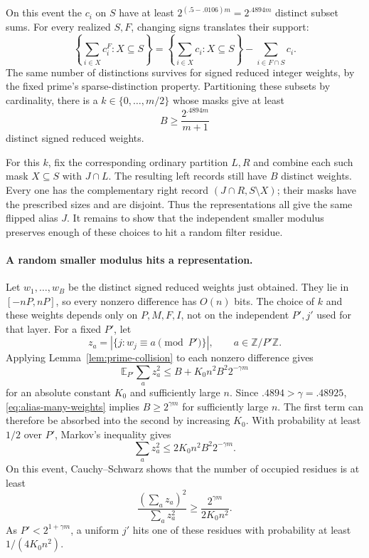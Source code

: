 On this event the $c_i$ on $S$ have at least
$2^{(.5-.0106)m}=2^{.4894m}$ distinct subset sums.
For every realized $S,F$, changing signs translates their support:
\[
 \left\{\sum_{i\in X}c_i^F:X\subseteq S\right\}
 =\left\{\sum_{i\in X}c_i:X\subseteq S\right\}
       -\sum_{i\in F\cap S}c_i.
\]
The same number of distinctions survives for signed reduced integer
weights, by the fixed prime's sparse-distinction property.
Partitioning these subsets by cardinality, there is a
$k\in\{0,\ldots,m/2\}$ whose masks give at least
\begin{equation}
 B\ge\frac{2^{.4894m}}{m+1}
 \label{eq:alias-many-weights}
\end{equation}
distinct signed reduced weights.

For this $k$, fix the corresponding ordinary partition $L,R$ and combine
each such mask $X\subseteq S$ with $J\cap L$.  The resulting left records
still have $B$ distinct weights.  Every one has the complementary right
record $(J\cap R,S\setminus X)$; their masks have the prescribed sizes
and are disjoint.  Thus the representations all give the same flipped
alias $J$.  It remains to show that the independent smaller modulus
preserves enough of these choices to hit a random filter residue.

\paragraph{A random smaller modulus hits a representation.}
Let $w_1,\ldots,w_B$ be the distinct signed reduced weights just obtained.
They lie in $[-nP,nP]$, so every nonzero difference has $O(n)$ bits.
The choice of $k$ and these weights depends only on
$P,M,F,I$, not on the independent $P',j'$ used for that layer.
For a fixed $P'$, let
\[
 z_a=|\{j:w_j\equiv a\pmod {P'}\}|,
 \qquad a\in\mathbb Z/P'\mathbb Z.
\]
Applying Lemma~\ref{lem:prime-collision} to each nonzero difference gives
\begin{equation}
 \mathbb E_{P'}\sum_a z_a^2
 \le B+K_0 n^2B^2 2^{-\gamma m}
 \label{eq:alias-collision-moment}
\end{equation}
for an absolute constant $K_0$ and sufficiently large $n$.
Since $.4894>\gamma=.48925$, \eqref{eq:alias-many-weights} implies
$B\ge2^{\gamma m}$ for sufficiently large $n$.  The first term can
therefore be absorbed into the second by increasing $K_0$.
With probability at least $1/2$ over $P'$, Markov's inequality gives
\[
 \sum_a z_a^2\le 2K_0n^2B^2 2^{-\gamma m}.
\]
On this event, Cauchy--Schwarz shows that the number of occupied residues
is at least
\[
 \frac{(\sum_a z_a)^2}{\sum_a z_a^2}
 \ge \frac{2^{\gamma m}}{2K_0n^2}.
\]
As $P'<2^{1+\gamma m}$, a uniform $j'$ hits one of these residues
with probability at least $1/(4K_0n^2)$.

